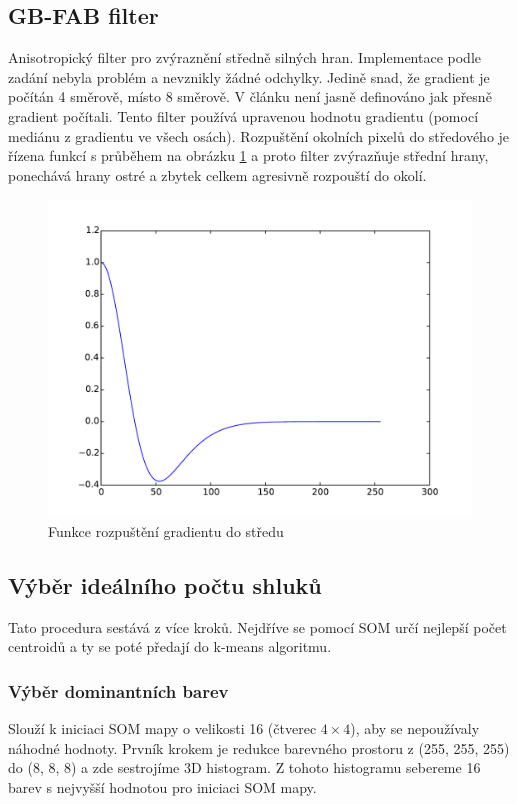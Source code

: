 \documentclass[fleqn,numbers=noenddot,headinclude,%
				11pt,a4paper,footinclude,%
				cleardoublepage=empty,abstractoff %
                ]{scrartcl}
\begin{document}
\subsection{GB-FAB filter}
\label{sub:gb-fab}
Anisotropický filter pro zvýraznění středně silných hran. Implementace podle zadání nebyla problém a nevznikly žádné odchylky. Jedině snad, že gradient je počítán 4 směrově, místo 8 směrově. V článku není jasně definováno jak přesně gradient počítali.
Tento filter používá upravenou hodnotu gradientu (pomocí mediánu z gradientu ve všech osách). Rozpuštění okolních pixelů do středového je řízena funkcí s průběhem na obrázku \ref{img:gbfab} a proto filter zvýrazňuje střední hrany, ponechává hrany ostré a zbytek celkem agresivně rozpouští do okolí.
\begin{figure}[htp]
\centering
\includegraphics[width=\textwidth]{plots/dfab_function.pdf}
\caption{Funkce rozpuštění gradientu do středu}
\label{img:gbfab}
\end{figure}

\subsection{Výběr ideálního počtu shluků}
\label{sub:som}
Tato procedura sestává z více kroků. Nejdříve se pomocí SOM určí nejlepší počet centroidů a ty se poté předají do k-means algoritmu.

\subsubsection{Výběr dominantních barev} Slouží k iniciaci SOM mapy o velikosti 16 (čtverec $4\times4$), aby se nepoužívaly náhodné hodnoty. Prvník krokem je redukce barevného prostoru z (255, 255, 255) do (8, 8, 8) a zde sestrojíme 3D histogram. Z tohoto histogramu sebereme 16 barev s nejvyšší hodnotou pro iniciaci SOM mapy.
\end{document}
